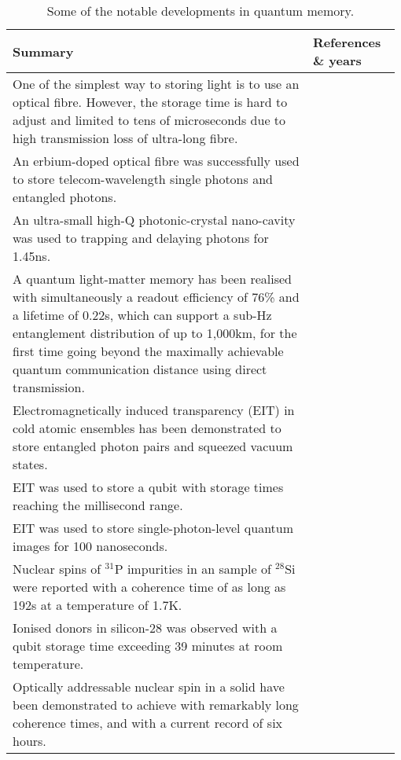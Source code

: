 \begin{table*}[!htbp]
	\begin{tabular}{|p{0.755\linewidth}|p{0.22\linewidth}|}
		\hline
	\textbf{Summary} & \textbf{References \& years} \\
	\hline \hline
		One of the simplest way to storing light is to use an optical fibre. However, the storage time is hard to adjust and limited to tens of microseconds due to high transmission loss of ultra-long fibre.  & \cite{bib:landry2007quantum, bib:lvovsky2009optical} \\
		\hline
		An erbium-doped optical fibre was successfully used to store telecom-wavelength single photons and entangled photons. & \cite{bib:saglamyurek2015quantum, bib:jin2015telecom} \\
		\hline
		An ultra-small high-Q photonic-crystal nano-cavity was used to trapping and delaying photons for 1.45ns. & \cite{bib:tanabe2007trapping} \\
		\hline
		A quantum light-matter memory has been realised with simultaneously a readout efficiency of 76\% and a lifetime of 0.22s, which can support a sub-Hz entanglement distribution of up to 1,000km, for the first time going beyond the maximally achievable quantum communication distance using direct transmission. &  \cite{bib:yang2016efficient}\\
		\hline
		Electromagnetically induced transparency (EIT) in cold atomic ensembles has been demonstrated to store entangled photon pairs and squeezed vacuum states. & \cite{bib:Choi2008mapping, bib:appel2008quantum, bib:honda2008storage} \\
		\hline
		EIT was used to store a qubit with storage times reaching the millisecond range. & \cite{bib:lettner2011remote,  bib:riedl2012bose, bib:xu2013long} \\
		\hline
		EIT was used to store single-photon-level quantum images for 100 nanoseconds. & \cite{bib:ding2013single} \\
		\hline
        Nuclear spins of ${}^{31}$P impurities in an sample of ${}^{28}$Si were reported with a coherence time of as long as 192s at a temperature of 1.7K. & \cite{bib:steger2012quantum} \\
        \hline
        Ionised donors in silicon-28 was observed with a qubit storage time exceeding 39 minutes at room temperature. & \cite{bib:saeedi2013room} \\
        \hline
        Optically addressable nuclear spin in a solid have been demonstrated to achieve with remarkably long coherence times, and with a current record of six hours. & \cite{bib:zhong2015optically} \\
        \hline
	\end{tabular}
	\captionspacetab \caption{Some of the notable developments in quantum memory.} \label{tab:memory}
\end{table*}

